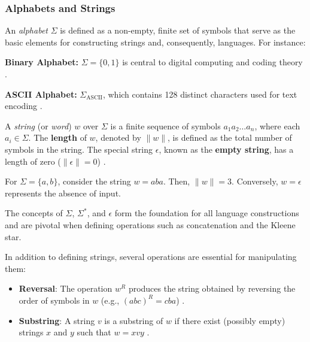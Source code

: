 \subsubsection{Alphabets and Strings}
An \textit{alphabet} $\Sigma$ is defined as a non-empty, finite set of symbols that serve as the basic elements for constructing strings and, consequently, languages. For instance:

\begin{example}
\textbf{Binary Alphabet:} $\Sigma = \{0, 1\}$ is central to digital computing and coding theory \cite{hopcroft2006introduction}.
\end{example}

\begin{example}
\textbf{ASCII Alphabet:} $\Sigma_{\text{ASCII}}$, which contains 128 distinct characters used for text encoding \cite{cady1986ascii}.
\end{example}

A \textit{string} (or \textit{word}) $w$ over $\Sigma$ is a finite sequence of symbols $a_1a_2\ldots a_n$, where each $a_i \in \Sigma$. The \textbf{length} of $w$, denoted by $\|w\|$, is defined as the total number of symbols in the string. The special string $\epsilon$, known as the \textbf{empty string}, has a length of zero ($\|\epsilon\| = 0$) \cite{hopcroft2006introduction}.

\begin{example}
For $\Sigma = \{a, b\}$, consider the string $w = aba$. Then, $\|w\| = 3$. Conversely, $w = \epsilon$ represents the absence of input.
\end{example}

\begin{remark}
The concepts of $\Sigma$, $\Sigma^\ast$, and $\epsilon$ form the foundation for all language constructions and are pivotal when defining operations such as concatenation and the Kleene star.
\end{remark}

In addition to defining strings, several operations are essential for manipulating them:
\begin{itemize}
    \item \textbf{Reversal}: The operation $w^R$ produces the string obtained by reversing the order of symbols in $w$ (e.g., $(abc)^R = cba$) \cite{hopcroft2006introduction}.
    \item \textbf{Substring}: A string $v$ is a substring of $w$ if there exist (possibly empty) strings $x$ and $y$ such that $w = xvy$ \cite{hopcroft2006introduction}.
\end{itemize}

